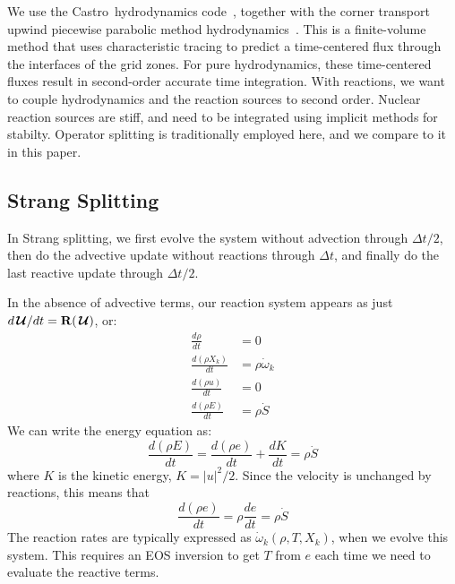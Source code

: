 \documentclass[times,modern]{aastex63}
\newcommand{\castro}{{\sf Castro}}
\newcommand{\omegadot}{\dot{\omega}}
\newcommand{\Sdot}{\dot{S}}
\newcommand{\odt}[1]{{\frac{{d#1}}{dt}}}
\newcommand{\Uc}{{\,\bm{\mathcal{U}}}}
\newcommand{\Rb}{{\bf R}}
\begin{document}
We use the \castro\ hydrodynamics code~\cite{castro}, together with
the corner transport upwind piecewise parabolic method
hydrodynamics~\citep{millercolella:2002}.  This is a finite-volume
method that uses characteristic tracing to predict a time-centered
flux through the interfaces of the grid zones.  For pure
hydrodynamics, these time-centered fluxes result in second-order
accurate time integration.  With reactions, we want to couple
hydrodynamics and the reaction sources to second order.  Nuclear
reaction sources are stiff, and need to be integrated using implicit
methods for stabilty.  Operator splitting is traditionally employed
here, and we compare to it in this paper.



\subsection{Strang Splitting}

In Strang splitting, we first evolve the system without advection
through $\Delta t/2$, then do the advective update without reactions
through $\Delta t$, and finally do the last reactive update through $\Delta t/2$.

In the absence of advective terms, our reaction system appears as just
$d\Uc/dt = \Rb(\Uc)$, or:
\begin{align}
\odt{\rho} & = 0 \\
\odt{(\rho X_k)} &= \rho \omegadot_k \\
\odt{(\rho u)} &= 0 \\
\odt{(\rho E)} &= \rho \Sdot
\end{align}
We can write the energy equation as:
\begin{equation}
\odt{(\rho E)} = \odt{(\rho e)} + \odt{K} = \rho \Sdot
\end{equation}
where $K$ is the kinetic energy, $K = |u|^2/2$.  Since the velocity is
unchanged by reactions, this means that
\begin{equation}
\odt{(\rho e)} = \rho \odt{e} = \rho \Sdot
\end{equation}
The reaction rates are typically expressed as $\omegadot_k(\rho, T,
X_k)$, when we evolve this system.  This requires an EOS inversion to get $T$ from $e$ each
time we need to evaluate the reactive terms.
\end{document}
